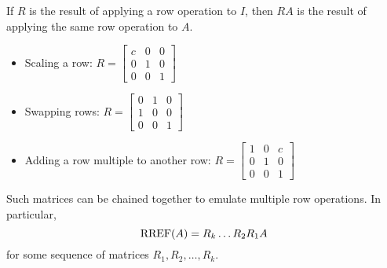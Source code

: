 \begin{fact}
If \(R\) is the result of applying a row operation to \(I\), then
\(RA\) is the result of applying the same row operation to \(A\).
\begin{itemize}
\item Scaling a row: \(R=
  \begin{bmatrix}
  c & 0 & 0 \\
  0 & 1 & 0 \\
  0 & 0 & 1
  \end{bmatrix}
\)
\item Swapping rows: \(R=
  \begin{bmatrix}
  0 & 1 & 0 \\
  1 & 0 & 0 \\
  0 & 0 & 1
  \end{bmatrix}
\)
\item Adding a row multiple to another row: \(R=
  \begin{bmatrix}
  1 & 0 & c \\
  0 & 1 & 0 \\
  0 & 0 & 1
  \end{bmatrix}
\)
\end{itemize}

Such matrices can be chained together to emulate multiple row operations.
In particular,
\[\operatorname{RREF}(A)=R_k\dots R_2R_1A\]
for some sequence of matrices \(R_1,R_2,\dots,R_k\).
\end{fact}

